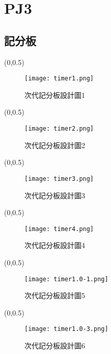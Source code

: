 \chapter{PJ3}


\section{記分板}




{\begin{textblock}{6}(0,0.5)
\begin{figure}
  \centering
  \texttt{[image: timer1.png]}
  \caption{次代記分板設計圖1}
  
\end{figure}
\end{textblock}}

{\begin{textblock}{6}(0,0.5)
\begin{figure}
  \centering
  \texttt{[image: timer2.png]}
  \caption{次代記分板設計圖2}
  \label{fig:example}
\end{figure}
\end{textblock}}

{\begin{textblock}{6}(0,0.5)
\begin{figure}
  \centering
  \texttt{[image: timer3.png]}
  \caption{次代記分板設計圖3}
  \label{fig:example}
\end{figure}
\end{textblock}}

{\begin{textblock}{6}(0,0.5)
\begin{figure}
  \centering
  \texttt{[image: timer4.png]}
  \caption{次代記分板設計圖4}
  \label{fig:example}
\end{figure}
\end{textblock}}

{\begin{textblock}{6}(0,0.5)
\begin{figure}
  \centering
  \texttt{[image: timer1.0-1.png]}
  \caption{次代記分板設計圖5}
  \label{fig:example}
\end{figure}
\end{textblock}}

{\begin{textblock}{6}(0,0.5)
\begin{figure}
  \centering
  \texttt{[image: timer1.0-3.png]}
  \caption{次代記分板設計圖6}
  \label{fig:example}
\end{figure}
\end{textblock}}


